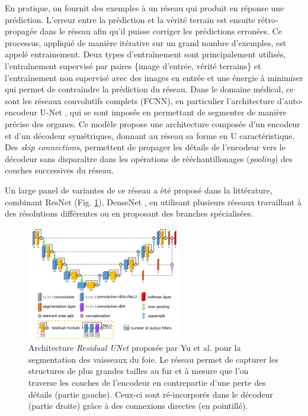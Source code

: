       En pratique, on fournit des exemples à un réseau qui produit en réponse une prédiction. L'erreur entre la prédiction et la vérité terrain est ensuite rétro-propagée dans le réseau afin qu'il puisse corriger les prédictions erronées. Ce processus, appliqué de manière itérative sur un grand nombre d'exemples, est appelé entrainement. Deux types d'entraînement sont principalement utilisés, l'entraînement supervisé par paires \{image d'entrée, vérité terrains\} et l'entraînement non supervisé avec des images en entrée et une énergie à minimiser qui permet de contraindre la prédiction du réseau.
      Dans le domaine médical, ce sont les réseaux convolutifs complets (FCNN), en particulier l'architecture d'auto-encodeur U-Net \cite{Ronneberger2015_Unet}, qui se sont imposés en permettant de segmenter de manière précise des organes. Ce modèle propose une architecture composée d'un encodeur et d'un décodeur symétriques, donnant au réseau sa forme en U caractéristique. Des \textit{skip connections}, permettent de propager les détails de l'encodeur vers le décodeur sans disparaître dans les opérations de rééchantillonages (\textit{pooling}) des couches successives du réseau.

      Un large panel de variantes de ce réseau a été proposé dans la littérature, combinant ResNet \cite{yu2019_liver_ResUnet}(Fig. \ref{fig:yu_resunet}), DenseNet \cite{Li2018_DenseUnet}, en utilisant plusieurs réseaux travaillant à des résolutions différentes ou en proposant des branches spécialisées.
      
      \begin{figure}[!ht]
        \centering
        \includegraphics[height=5cm]{Images/Residual_Unet_Yu.png}
        \caption{Architecture \textit{Residual UNet} proposée par Yu et al. \cite{yu2019_liver_ResUnet} pour la segmentation des vaisseaux du foie. Le réseau permet de capturer les structures de plus grandes tailles au fur et à mesure que l'on traverse les couches de l'encodeur en contrepartie d'une perte des détails (partie gauche). Ceux-ci sont ré-incorporés dans le décodeur (partie droite) grâce à des connexions directes (en pointillé). }
        \label{fig:yu_resunet}
      \end{figure}
      
